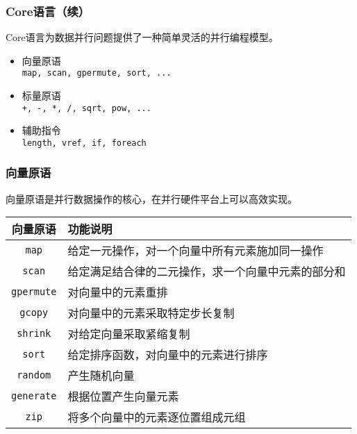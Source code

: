 \documentclass[]{beamer}
\begin{document}
\begin{frame}
  \frametitle{Core语言（续）}
  Core语言为数据并行问题提供了一种简单灵活的并行编程模型。
  \begin{itemize}
    \item 向量原语\\
      \texttt{map, scan, gpermute, sort, ...}
    \item 标量原语\\
      \texttt{+, -, *, /, sqrt, pow, ...}
    \item 辅助指令\\
      \texttt{length, vref, if, foreach}
  \end{itemize}
\end{frame}

\begin{frame}
  \frametitle{向量原语}
  向量原语是并行数据操作的核心，在并行硬件平台上可以高效实现。
  \begin{table}
    \centering
    \footnotesize
    \begin{tabularx}{\linewidth}{cX}
      \toprule
      \textbf{向量原语} & \textbf{功能说明} \\
      \midrule
      \texttt{map} & 给定一元操作，对一个向量中所有元素施加同一操作\\
      \texttt{scan} & 给定满足结合律的二元操作，求一个向量中元素的部分和\\
      \texttt{gpermute} & 对向量中的元素重排\\
      \texttt{gcopy} & 对向量中的元素采取特定步长复制\\
      \texttt{shrink} & 对给定向量采取紧缩复制\\
      \texttt{sort} & 给定排序函数，对向量中的元素进行排序\\
      \texttt{random} & 产生随机向量\\
      \texttt{generate} & 根据位置产生向量元素\\
      \texttt{zip} & 将多个向量中的元素逐位置组成元组\\
      \bottomrule
    \end{tabularx}
  \end{table}
\end{frame}

\begin{frame}
\end{frame}
\end{document}
